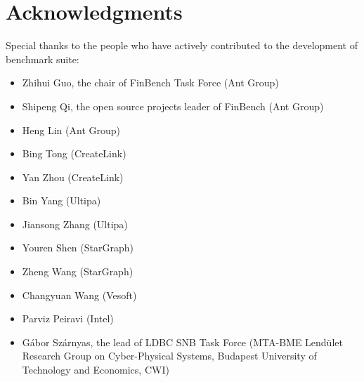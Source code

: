 \chapter*{Acknowledgments}
\label{sec:acknowledgments}

\renewcommand{\labelitemii}{\textbullet}

Special thanks to the people who have actively contributed to the development of benchmark suite:

\begin{itemize}
  \item Zhihui Guo, the chair of FinBench Task Force (Ant Group)
  \item Shipeng Qi, the open source projects leader of FinBench (Ant Group)
  \item Heng Lin (Ant Group)
  \item Bing Tong (CreateLink)
  \item Yan Zhou (CreateLink)
  \item Bin Yang (Ultipa)
  \item Jiansong Zhang (Ultipa)
  \item Youren Shen (StarGraph)
  \item Zheng Wang (StarGraph)
  \item Changyuan Wang (Vesoft)
  \item Parviz Peiravi (Intel)
  \item Gábor Szárnyas, the lead of LDBC SNB Task Force (MTA-BME Lendület Research Group on Cyber-Physical Systems, Budapest University
  of Technology and Economics, CWI)
\end{itemize}